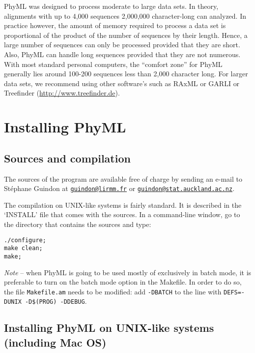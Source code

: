 \documentclass[a4paper,12pt]{article}
\newcommand{\x}[1]{\texttt{#1}}
\begin{document}
PhyML was designed to  process moderate to large data sets.  In theory,  alignments with up to 4,000
sequences 2,000,000 character-long can analyzed.  In practice however, the amount of memory required
to process  a data set is proportional  of the product of  the number of sequences  by their length.
Hence, a large number  of sequences can only be processed provided that  they are short. Also, PhyML
can  handle long  sequences  provided  that they  are  not numerous.   With  most standard  personal
computers, the  ``comfort zone'' for PhyML generally  lies around 100-200 sequences  less than 2,000
character  long.   For  larger  data  sets,  we  recommend using  other  software's  such  as  RAxML
\cite{raxml}      or       GARLI      \cite{garli}      or      Treefinder
(\href{http://www.treefinder.de}{http://www.treefinder.de}).


\section{Installing PhyML}

\subsection{Sources and compilation}

The sources of the  program are available free of charge by sending  an e-mail to St\'ephane Guindon
at                      \href{mailto:guindon@lirmm.fr}{\x{guindon@lirmm.fr}}                      or
\href{mailto:guindon@stat.auckland.ac.nz}{\x{guindon@stat.auckland.ac.nz}}.

The compilation on UNIX-like systems is fairly  standard. It is described in the `INSTALL' file that
comes with the sources. In a command-line window,  go to the directory that contains the sources and
type:

{\setlength{\baselineskip}{0.5\baselineskip}
\begin{verbatim}
./configure;
make clean;
make;
\end{verbatim}
}

{\em Note} -- when PhyML  is going to be used mostly of exclusively in  batch mode, it is preferable
to turn on the batch mode option in the  Makefile. In order to do so, the file \x{Makefile.am} needs
to be modified: add \x{-DBATCH} to the line with \x{DEFS=-DUNIX -D\$(PROG) -DDEBUG}.



\subsection{Installing PhyML on UNIX-like systems (including Mac OS)}
\end{document}
